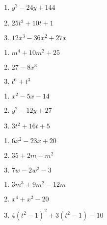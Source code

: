 \documentclass{ximera}
\begin{document}
\begin{multicols}{3}
\begin{enumerate}
\setcounter{enumi}{\value{HW}}

\item $y^2 - 24y + 144$
\item $25t^2 + 10t + 1$
\item $12x^3 - 36x^2 + 27x$

\setcounter{HW}{\value{enumi}}
\end{enumerate}
\end{multicols}

\begin{multicols}{3}
\begin{enumerate}
\setcounter{enumi}{\value{HW}}

\item $m^4 + 10m^2 + 25$
\item $27 - 8x^3$
\item $t^6 +t^3$


\setcounter{HW}{\value{enumi}}
\end{enumerate}
\end{multicols}



\begin{multicols}{3}
\begin{enumerate}
\setcounter{enumi}{\value{HW}}

\item $x^2 - 5x - 14$
\item $y^2 - 12y + 27$
\item $3t^2 + 16t + 5$


\setcounter{HW}{\value{enumi}}
\end{enumerate}
\end{multicols}


\begin{multicols}{3}
\begin{enumerate}
\setcounter{enumi}{\value{HW}}

\item $6x^2 - 23x + 20$
\item $35+2m - m^2$
\item $7w - 2w^2 - 3$



\setcounter{HW}{\value{enumi}}
\end{enumerate}
\end{multicols}


\begin{multicols}{3}
\begin{enumerate}
\setcounter{enumi}{\value{HW}}

\item $3m^3 + 9m^2 - 12m$
\item $x^4 + x^2 - 20$
\item $4(t^2-1)^2 +3(t^2-1) - 10$


\setcounter{HW}{\value{enumi}}
\end{enumerate}
\end{multicols}
\end{document}
